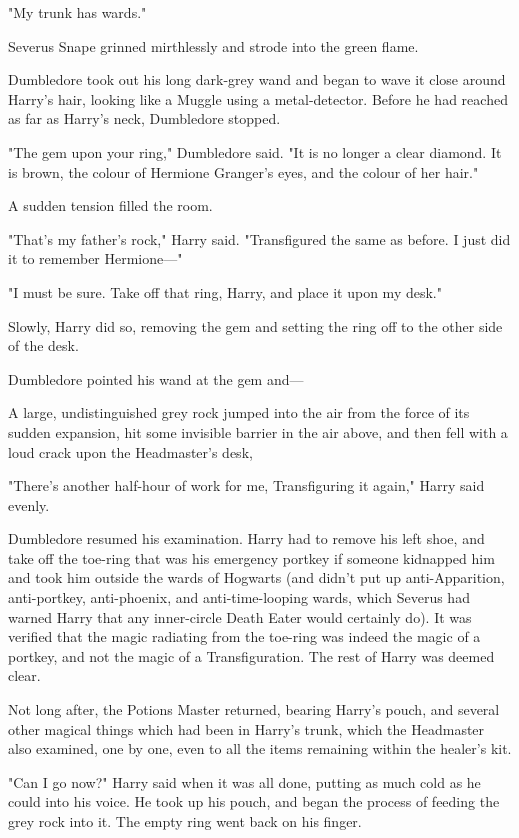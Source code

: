 "My trunk has wards."

Severus Snape grinned mirthlessly and strode into the green flame.

Dumbledore took out his long dark-grey wand and began to wave it close around
Harry's hair, looking like a Muggle using a metal-detector. Before he had
reached as far as Harry's neck, Dumbledore stopped.

"The gem upon your ring," Dumbledore said. "It is no longer a clear diamond. It
is brown, the colour of Hermione Granger's eyes, and the colour of her hair."

A sudden tension filled the room.

"That's my father's rock," Harry said. "Transfigured the same as before. I just
did it to remember Hermione—"

"I must be sure. Take off that ring, Harry, and place it upon my desk."

Slowly, Harry did so, removing the gem and setting the ring off to the other
side of the desk.

Dumbledore pointed his wand at the gem and—

A large, undistinguished grey rock jumped into the air from the force of its
sudden expansion, hit some invisible barrier in the air above, and then fell
with a loud crack upon the Headmaster's desk,

"There's another half-hour of work for me, Transfiguring it again," Harry said
evenly.

Dumbledore resumed his examination. Harry had to remove his left shoe, and take
off the toe-ring that was his emergency portkey if someone kidnapped him and
took him outside the wards of Hogwarts (and didn't put up anti-Apparition,
anti-portkey, anti-phoenix, and anti-time-looping wards, which Severus had
warned Harry that any inner-circle Death Eater would certainly do). It was
verified that the magic radiating from the toe-ring was indeed the magic of a
portkey, and not the magic of a Transfiguration. The rest of Harry was deemed
clear.

Not long after, the Potions Master returned, bearing Harry's pouch, and several
other magical things which had been in Harry's trunk, which the Headmaster also
examined, one by one, even to all the items remaining within the healer's kit.

"Can I go now?" Harry said when it was all done, putting as much cold as he
could into his voice. He took up his pouch, and began the process of feeding
the grey rock into it. The empty ring went back on his finger.

